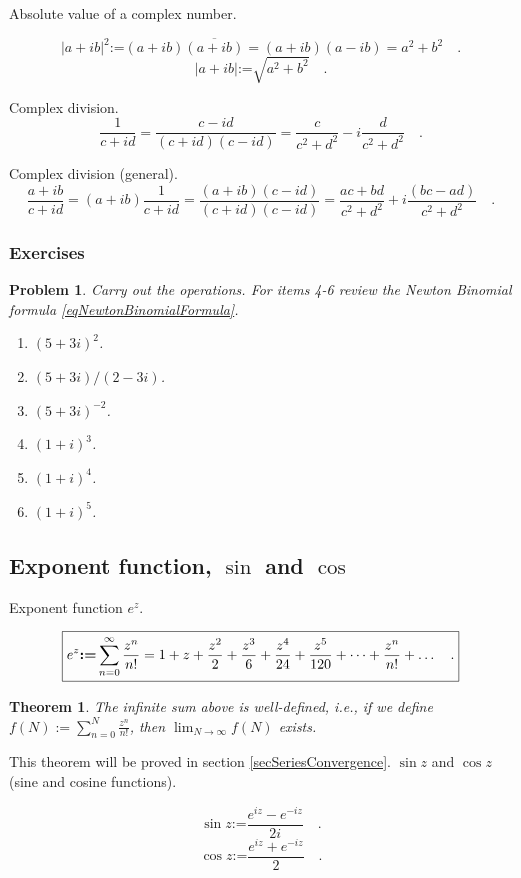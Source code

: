 \documentclass[12pt]{book}
\newcommand{\eqdef}{\textbf{:=}}
\newcommand{\importantFormula}[1]{\begin{equation} \boxed{#1} \end{equation}}
\newtheorem{problem}{Problem}[section]
\newtheorem{theorem}{Theorem}[section]
\begin{document}
 Absolute value of a complex number.

\[
|a+ib|^2\eqdef (a+ib)\overline{(a+ib)}=(a+ib)(a-ib)=a^2+b^2 \quad .
\]
\[
|a+ib|\eqdef \sqrt{a^2+b^2}\quad .
\]

Complex division.
\[
\frac{1}{c+id}= \frac{c-id}{(c+id)(c-id)}=\frac{c}{c^2+d^2}-i\frac{d}{c^2+d^2} \quad .
\]

Complex division (general).
\[
\frac{a+ib}{c+id}=(a+ib)\frac{1}{c+id}= \frac{(a+ib)(c-id)}{(c+id)(c-id)}= \frac{ac+bd}{c^2+d^2}+i\frac{(bc-ad)}{c^2+d^2} \quad .
\]

\subsubsection{Exercises}
\begin{problem}
Carry out the operations. For items 4-6 review the Newton Binomial formula \eqref{eqNewtonBinomialFormula}.
\begin{enumerate}
\item $(5+3i)^2$.
\item $(5+3i)/(2-3i)$.
\item $(5+3i)^{-2}$.
\item $(1+i)^3$.
\item $(1+i)^4$.
\item $(1+i)^5$.
\end{enumerate}
\end{problem}

\subsection{Exponent function, $\sin$ and $\cos$}
 Exponent function $e^z$. 

\importantFormula{\label{eqExponentFunctionDefinition}
e^{z}\eqdef \sum_{n=0}^{\infty} \frac{z^n}{n!} = 1+z+\frac{z^{2}}{2}+\frac{z^3}{6}+\frac{z^4}{24}+\frac{z^5}{120}+\dots+\frac{z^n}{n!}+\dots \quad .
}

\begin{theorem} The infinite sum above is well-defined, i.e., if we define $f(N):=\sum_{n=0}^{N} \frac{z^n}{n!}$, then $\displaystyle\lim_{N\to \infty} f(N)$ exists.
\end{theorem}

This theorem will be proved in section \ref{secSeriesConvergence}.
  $\sin z$ and $\cos z$ (sine and cosine functions).

\importantFormula{
\sin z\eqdef \frac{e^{iz}-e^{-iz}}{2i} \quad .
}
\importantFormula{
\cos z\eqdef \frac{e^{iz}+e^{-iz}}{2}\quad .
}
\end{document}
